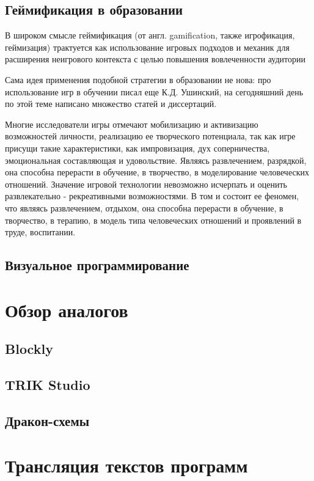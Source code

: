 \subsection{Геймификация в образовании}

В широком смысле геймификация (от англ. gamification, также игрофикация, геймизация) трактуется как использование игровых подходов и механик для расширения неигрового контекста с целью повышения вовлеченности аудитории \cite{gamification}

Сама идея применения подобной стратегии в образовании не нова: про использование игр в обучении писал еще К.Д. Ушинский, на сегодняшний день по этой теме написано множество статей и диссертаций.

Многие исследователи игры отмечают мобилизацию и активизацию возможностей личности, реализацию ее творческого потенциала, так как игре присущи такие характеристики, как импровизация, дух соперничества, эмоциональная составляющая и удовольствие. Являясь развлечением, разрядкой, она способна перерасти в обучение, в творчество, в моделирование человеческих отношений. Значение игровой технологии невозможно исчерпать и оценить развлекательно - рекреативными возможностями. В том и состоит ее феномен, что являясь развлечением, отдыхом, она способна перерасти в обучение, в творчество, в терапию, в модель типа человеческих отношений и проявлений в труде, воспитании. \cite{gamification-ed}

\subsection{Визуальное программирование}
\section{Обзор аналогов}
\subsection{Blockly}
\subsection{TRIK Studio}
\subsection{Дракон-схемы}
\section{Трансляция текстов программ}
